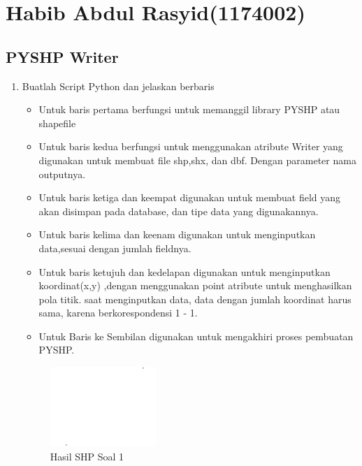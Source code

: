 \section{Habib Abdul Rasyid(1174002)}
\subsection{PYSHP Writer}
\begin{enumerate}
	\item Buatlah Script Python dan jelaskan berbaris
	
	\begin{itemize}
		\item Untuk baris pertama berfungsi untuk memanggil library PYSHP atau shapefile
		\item Untuk baris kedua berfungsi untuk menggunakan atribute Writer yang digunakan untuk membuat file shp,shx, dan dbf. Dengan parameter nama outputnya.
		\item Untuk baris ketiga dan keempat digunakan untuk membuat field yang akan disimpan pada database, dan tipe data yang digunakannya.
		\item Untuk baris kelima dan keenam digunakan untuk menginputkan data,sesuai dengan jumlah fieldnya.
		\item Untuk baris ketujuh dan kedelapan digunakan untuk menginputkan koordinat(x,y) ,dengan menggunakan point atribute untuk menghasilkan pola titik. \hfill\break
		saat menginputkan data, data dengan jumlah koordinat harus sama, karena berkorespondensi 1 - 1.
		\item Untuk Baris ke Sembilan digunakan untuk mengakhiri proses pembuatan PYSHP.
	\end{itemize}
	\hfill\break
	\begin{figure}[H]
		\includegraphics[width=4cm]{figures/1174002/2/1.png}
		\centering
		\caption{Hasil SHP Soal 1}
	\end{figure}


\end{enumerate}
